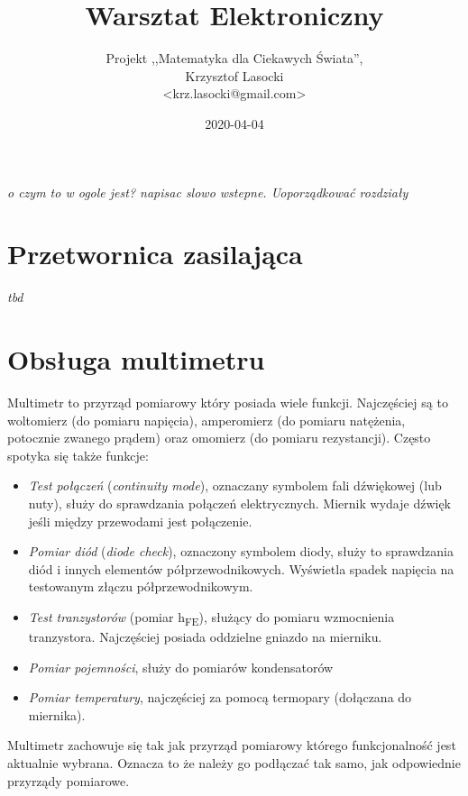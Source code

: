 \documentclass{pdfBooklets}
\title{Warsztat Elektroniczny}
\author{%
	Projekt ,,Matematyka dla Ciekawych Świata'',\\
	Krzysztof Lasocki\\\normalsize\ttfamily <krz.lasocki@gmail.com>
}
\date  {2020-04-04}
\begin{document}
\maketitle


\textit{o czym to w ogole jest? napisac slowo wstepne. Uoporządkować rozdziały}

\section{Przetwornica zasilająca}

\textit{tbd}

\section{Obsługa multimetru}

Multimetr to przyrząd pomiarowy który posiada wiele funkcji. Najczęściej są to woltomierz (do pomiaru napięcia), amperomierz
(do pomiaru natężenia, potocznie zwanego prądem) oraz omomierz (do pomiaru rezystancji). Często spotyka się także funkcje:
\begin{itemize}
\item \emph{Test połączeń} (\textit{continuity mode}), oznaczany symbolem fali dźwiękowej (lub nuty), służy do sprawdzania połączeń elektrycznych.
  Miernik wydaje dźwięk jeśli między przewodami jest połączenie.
\item \emph{Pomiar diód} (\textit{diode check}), oznaczony symbolem diody, służy to sprawdzania diód i innych elementów półprzewodnikowych.
  Wyświetla spadek napięcia na testowanym złączu półprzewodnikowym.
\item \emph{Test tranzystorów} (pomiar h\textsubscript{FE}), służący do pomiaru wzmocnienia tranzystora. Najczęściej posiada oddzielne gniazdo
  na mierniku.
\item \emph{Pomiar pojemności}, służy do pomiarów kondensatorów
\item \emph{Pomiar temperatury}, najczęściej za pomocą termopary (dołączana do miernika).
\end{itemize}

Multimetr zachowuje się tak jak przyrząd pomiarowy którego funkcjonalność jest aktualnie wybrana. Oznacza to że należy go podłączać
tak samo, jak odpowiednie przyrządy pomiarowe. 
\end{document}
